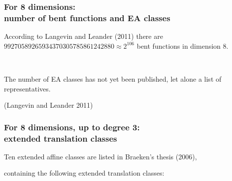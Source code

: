 \documentclass[pdf,sprung,slideColor,nocolorBG]{beamer}
\newenvironment{colortheme}[1]{
\def\ProvidesPackageRCS $##1${\relax}
\renewcommand{\ProcessOptions}{\relax}
\makeatletter

\makeatother
}{}
\newcommand{\slidecite}[1]{\tiny{(#1)}\normalsize{}}
\begin{document}
\begin{colortheme}{seagull}

\begin{frame}
\frametitle{For 8 dimensions: \\ number of bent functions and EA classes}

According to Langevin and Leander (2011)
there are $99270589265934370305785861242880 \approx 2^{106}$ bent functions in dimension 8.

~

The number of EA classes has not yet been published, let alone a list of representatives.

\slidecite{Langevin and Leander 2011}
\end{frame}

\begin{frame}
\frametitle{For 8 dimensions, up to degree 3: \\ extended translation classes}

Ten extended affine classes are listed in Braeken's thesis (2006),

containing the following extended translation classes:


\end{frame}
\end{colortheme}
\end{document}
